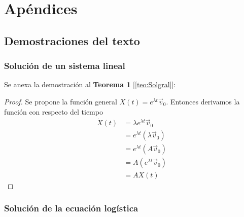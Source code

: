 \chapter{Apéndices}\label{ch:Ap}

\section{Demostraciones del texto}
\subsection{Solución de un sistema lineal}
Se anexa la demostración al \textbf{Teorema 1} [\ref{teo:Solgral}]:
\begin{proof}
	Se propone la función general $X(t)=e^{\lambda t}\vec{v}_0$. Entonces derivamos la función con respecto del tiempo
	\begin{align*}
		\dot{X}(t) &= \lambda e^{\lambda t}\vec{v}_0\\
				   &= e^{\lambda t}(\lambda\vec{v}_0)\\
				   &= e^{\lambda t}(A\vec{v}_0)		\\
				   &= A(e^{\lambda t}\vec{v}_0)\\
				   &= AX(t)
	\end{align*}
\end{proof}

\subsection{Solución de la ecuación logística}\label{sec:SolEqLogistica}

